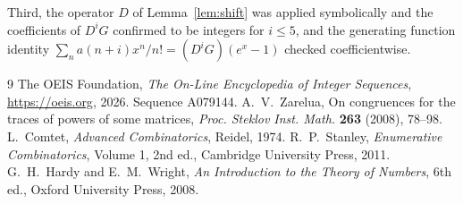 \documentclass[11pt,a4paper]{article}
\theoremstyle{plain}
\theoremstyle{definition}
\begin{document}
Third, the operator $D$ of Lemma~\ref{lem:shift} was applied symbolically and the
coefficients of $D^{i}G$ confirmed to be integers for $i\le5$, and the generating function
identity $\sum_n a(n+i)x^{n}/n! = (D^{i}G)(e^{x}-1)$ checked coefficientwise.

\begin{thebibliography}{9}
 The OEIS Foundation, \emph{The On-Line Encyclopedia of Integer
Sequences}, \url{https://oeis.org}, 2026. Sequence A079144.
 A.~V.~Zarelua, On congruences for the traces of powers of some
matrices, \emph{Proc. Steklov Inst. Math.} \textbf{263} (2008), 78--98.
 L.~Comtet, \emph{Advanced Combinatorics}, Reidel, 1974.
 R.~P.~Stanley, \emph{Enumerative Combinatorics}, Volume 1, 2nd ed.,
Cambridge University Press, 2011.
 G.~H.~Hardy and E.~M.~Wright, \emph{An Introduction to the Theory of
Numbers}, 6th ed., Oxford University Press, 2008.
\end{thebibliography}
\end{document}
